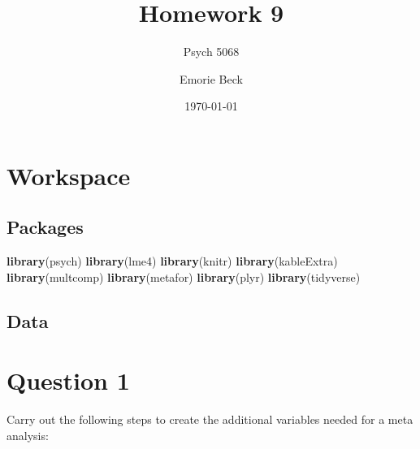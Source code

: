 \documentclass[]{article}
\title{Homework 9}
\subtitle{Psych 5068}
\author{Emorie Beck}
\date{\today}
\newenvironment{Shaded}{\begin{snugshade}}{\end{snugshade}}
\newcommand{\KeywordTok}[1]{\textcolor[rgb]{0.13,0.29,0.53}{\textbf{#1}}}
\newcommand{\StringTok}[1]{\textcolor[rgb]{0.31,0.60,0.02}{#1}}
\newcommand{\OperatorTok}[1]{\textcolor[rgb]{0.81,0.36,0.00}{\textbf{#1}}}
\newcommand{\NormalTok}[1]{#1}
\begin{document}
\maketitle

{
\setcounter{tocdepth}{2}
\tableofcontents
}
\section{Workspace}\label{workspace}

\subsection{Packages}\label{packages}

\begin{Shaded}
\begin{Highlighting}[]
\KeywordTok{library}\NormalTok{(psych)}
\KeywordTok{library}\NormalTok{(lme4)}
\KeywordTok{library}\NormalTok{(knitr)}
\KeywordTok{library}\NormalTok{(kableExtra)}
\KeywordTok{library}\NormalTok{(multcomp)}
\KeywordTok{library}\NormalTok{(metafor)}
\KeywordTok{library}\NormalTok{(plyr)}
\KeywordTok{library}\NormalTok{(tidyverse)}
\end{Highlighting}
\end{Shaded}

\subsection{Data}\label{data}

\begin{Shaded}
\end{Shaded}

\section{Question 1}\label{question-1}

Carry out the following steps to create the additional variables needed
for a meta analysis:
\end{document}
